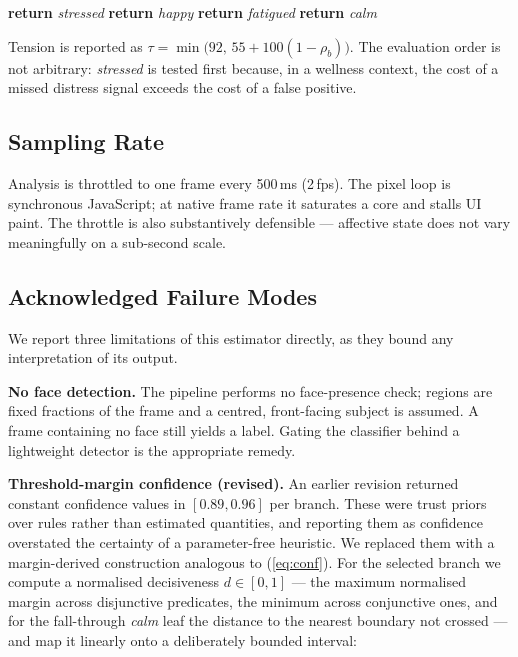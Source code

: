 \documentclass[runningheads]{llncs}
\begin{document}
\begin{algorithmic}[1]
    \STATE \textbf{return} \textit{stressed}
    \STATE \textbf{return} \textit{happy}
    \STATE \textbf{return} \textit{fatigued}
\ELSE
    \STATE \textbf{return} \textit{calm}
\ENDIF
\end{algorithmic}

Tension is reported as
$\tau = \min\bigl(92,\, 55 + 100(1 - \rho_b)\bigr)$.
The evaluation order is not arbitrary: \textit{stressed} is tested first
because, in a wellness context, the cost of a missed distress signal exceeds
the cost of a false positive.

\subsection{Sampling Rate}
Analysis is throttled to one frame every 500\,ms (2\,fps). The pixel loop is
synchronous JavaScript; at native frame rate it saturates a core and stalls UI
paint. The throttle is also substantively defensible --- affective state does
not vary meaningfully on a sub-second scale.

\subsection{Acknowledged Failure Modes}
We report three limitations of this estimator directly, as they bound any
interpretation of its output.

\textbf{No face detection.} The pipeline performs no face-presence check;
regions are fixed fractions of the frame and a centred, front-facing subject
is assumed. A frame containing no face still yields a label. Gating the
classifier behind a lightweight detector is the appropriate remedy.

\textbf{Threshold-margin confidence (revised).} An earlier revision returned
constant confidence values in $[0.89, 0.96]$ per branch. These were trust
priors over rules rather than estimated quantities, and reporting them as
confidence overstated the certainty of a parameter-free heuristic. We replaced
them with a margin-derived construction analogous to (\ref{eq:conf}). For the
selected branch we compute a normalised decisiveness $d \in [0,1]$ --- the
maximum normalised margin across disjunctive predicates, the minimum across
conjunctive ones, and for the fall-through \textit{calm} leaf the distance to
the nearest boundary not crossed --- and map it linearly onto a deliberately
bounded interval:
\end{document}
